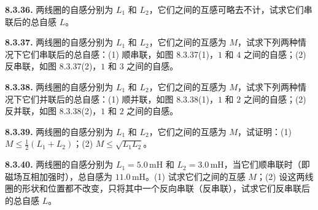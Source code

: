 \begin{center}
\end{center}

\vfill
\newpage

\textbf{8.3.36.} 两线圈的自感分别为 $L_{1}$ 和 $L_{2}$，它们之间的互感可略去不计，试求它们串联后的总自感 $L$。

\vfill
\newpage

\textbf{8.3.37.} 两线圈的自感分别为 $L_{1}$ 和 $L_{2}$，它们之间的互感为 $M$，试求下列两种情况下它们串联后的总自感：(1) 顺串联，如图 8.3.37(1)，$1$ 和 $4$ 之间的自感；(2) 反串联，如图 8.3.37(2)，$1$ 和 $3$ 之间的自感。

\begin{center}
  \begin{minipage}[b]{0.47\linewidth}
    \centering
  \end{minipage}\hfill
  \begin{minipage}[b]{0.47\linewidth}
    \centering
  \end{minipage}
\end{center}

\vfill
\newpage

\textbf{8.3.38.} 两线圈的自感分别为 $L_{1}$ 和 $L_{2}$，它们之间的互感为 $M$，试求下列两种情况下它们并联后的总自感：(1) 顺并联，如图 8.3.38(1)，$1$ 和 $2$ 之间的自感；(2) 反并联，如图 8.3.38(2)，$1$ 和 $2$ 之间的自感。

\begin{center}
  \begin{minipage}[b]{0.47\linewidth}
    \centering
  \end{minipage}\hfill
  \begin{minipage}[b]{0.47\linewidth}
    \centering
  \end{minipage}
\end{center}

\vfill
\newpage

\textbf{8.3.39.} 两线圈的自感分别为 $L_{1}$ 和 $L_{2}$，它们之间的互感为 $M$，试证明：(1) $\displaystyle M \leqslant \frac{1}{2} (L_{1} + L_{2})$；(2) $M \leqslant \sqrt{L_{1} L_{2}}$。

\vfill
\newpage

\textbf{8.3.40.} 两线圈的自感分别为 $L_{1} = 5.0\,\mathrm{mH}$ 和 $L_{2} = 3.0\,\mathrm{mH}$，当它们顺串联时（即磁场互相加强时），总自感为 $11.0\,\mathrm{mH}$。(1) 试求它们之间的互感 $M$；(2) 设这两线圈的形状和位置都不改变，只将其中一个反向串联（反串联），试求它们反串联后的总自感 $L$。

